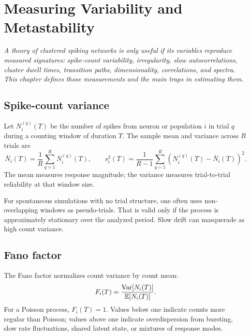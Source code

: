 \chapter{Measuring Variability and Metastability}
\label{ch:measuring-variability-metastability}

\textit{A theory of clustered spiking networks is only useful if its variables reproduce measured signatures: spike-count variability, irregularity, slow autocorrelations, cluster dwell times, transition paths, dimensionality, correlations, and spectra. This chapter defines those measurements and the main traps in estimating them.}

\section{Spike-count variance}
\label{sec:spike-count-variance}

Let $N_i^{(q)}(T)$ be the number of spikes from neuron or population $i$ in trial $q$ during a counting window of duration $T$. The sample mean and variance across $R$ trials are
%
\begin{equation}
  \bar N_i(T)=\frac{1}{R}\sum_{q=1}^R N_i^{(q)}(T),
  \qquad
  s_i^2(T)=\frac{1}{R-1}\sum_{q=1}^R
  \left(N_i^{(q)}(T)-\bar N_i(T)\right)^2.
  \label{eq:sample-count-variance}
\end{equation}
%
The mean measures response magnitude; the variance measures trial-to-trial reliability at that window size.

For spontaneous simulations with no trial structure, one often uses non-overlapping windows as pseudo-trials. That is valid only if the process is approximately stationary over the analyzed period. Slow drift can masquerade as high count variance.

\section{Fano factor}
\label{sec:fano-factor-measurement}

The Fano factor normalizes count variance by count mean:
%
\begin{equation}
  F_i(T)=\frac{\operatorname{Var}[N_i(T)]}{\mathbb{E}[N_i(T)]}.
  \label{eq:fano-measurement}
\end{equation}
%
For a Poisson process, $F_i(T)=1$. Values below one indicate counts more regular than Poisson; values above one indicate overdispersion from bursting, slow rate fluctuations, shared latent state, or mixtures of response modes.

